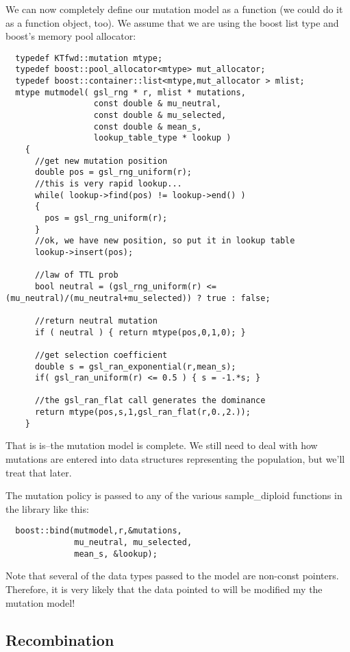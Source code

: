\documentclass{article}
\begin{document}
We can now completely define our mutation model as a function (we could do it as a function object, too).  We assume that we are using the boost list type and boost's memory pool allocator:

\begin{lstlisting}
  typedef KTfwd::mutation mtype;
  typedef boost::pool_allocator<mtype> mut_allocator;
  typedef boost::container::list<mtype,mut_allocator > mlist;
  mtype mutmodel( gsl_rng * r, mlist * mutations,
                  const double & mu_neutral,
                  const double & mu_selected,
                  const double & mean_s,
                  lookup_table_type * lookup )
    {
      //get new mutation position
      double pos = gsl_rng_uniform(r);
      //this is very rapid lookup...
      while( lookup->find(pos) != lookup->end() )
      {
        pos = gsl_rng_uniform(r);
      }
      //ok, we have new position, so put it in lookup table
      lookup->insert(pos);

      //law of TTL prob
      bool neutral = (gsl_rng_uniform(r) <= (mu_neutral)/(mu_neutral+mu_selected)) ? true : false;

      //return neutral mutation
      if ( neutral ) { return mtype(pos,0,1,0); }

      //get selection coefficient
      double s = gsl_ran_exponential(r,mean_s);
      if( gsl_ran_uniform(r) <= 0.5 ) { s = -1.*s; }

      //the gsl_ran_flat call generates the dominance
      return mtype(pos,s,1,gsl_ran_flat(r,0.,2.));
    }
\end{lstlisting}

That is is--the mutation model is complete.  We still need to deal with how mutations are entered into data structures representing the population, but we'll treat that later.

The mutation policy is passed to any of the various sample\_diploid functions in the library like this:

\begin{lstlisting}
  boost::bind(mutmodel,r,&mutations,
              mu_neutral, mu_selected,
              mean_s, &lookup);
\end{lstlisting}

Note that several of the data types passed to the model are non-const pointers.  Therefore, it is very likely that the data pointed to will be modified my the mutation model!

\subsection{Recombination}
\end{document}
